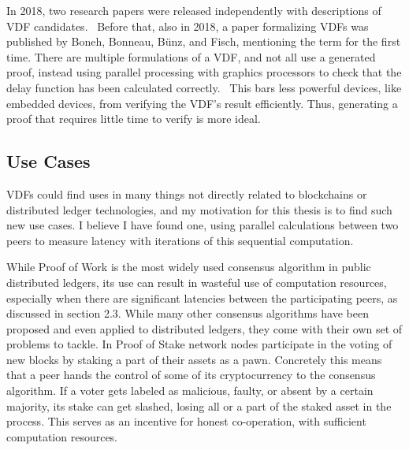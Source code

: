 In 2018, two research papers were released independently with descriptions of VDF candidates.~\cite{Wesolowski2018-rf, Pietrzak2018-xs} Before that, also in 2018, a paper formalizing VDFs was published by Boneh, Bonneau, Bünz, and Fisch, mentioning the term for the first time. There are multiple formulations of a VDF, and not all use a generated proof, instead using parallel processing with graphics processors to check that the delay function has been calculated correctly.~\cite{Yakovenko2018-zn} This bars less powerful devices, like embedded devices, from verifying the VDF's result efficiently. Thus, generating a proof that requires little time to verify is more ideal.~\cite{Boneh_undated-ml}

\subsection{Use Cases}
VDFs could find uses in many things not directly related to blockchains or distributed ledger technologies, and my motivation for this thesis is to find such new use cases. I believe I have found one, using parallel calculations between two peers to measure latency with iterations of this sequential computation.

While Proof of Work is the most widely used consensus algorithm in public distributed ledgers, its use can result in wasteful use of computation resources, especially when there are significant latencies between the participating peers, as discussed in section 2.3. While many other consensus algorithms have been proposed and even applied to distributed ledgers, they come with their own set of problems to tackle. In Proof of Stake network nodes participate in the voting of new blocks by staking a part of their assets as a pawn. Concretely this means that a peer hands the control of some of its cryptocurrency to the consensus algorithm. If a voter gets labeled as malicious, faulty, or absent by a certain majority, its stake can get slashed, losing all or a part of the staked asset in the process. This serves as an incentive for honest co-operation, with sufficient computation resources.

